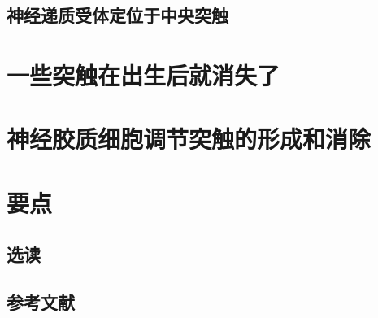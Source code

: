 \subsection{神经递质受体定位于中央突触}

\section{一些突触在出生后就消失了}

\section{神经胶质细胞调节突触的形成和消除}

\section{要点}
\subsection{选读}
\subsection{参考文献}